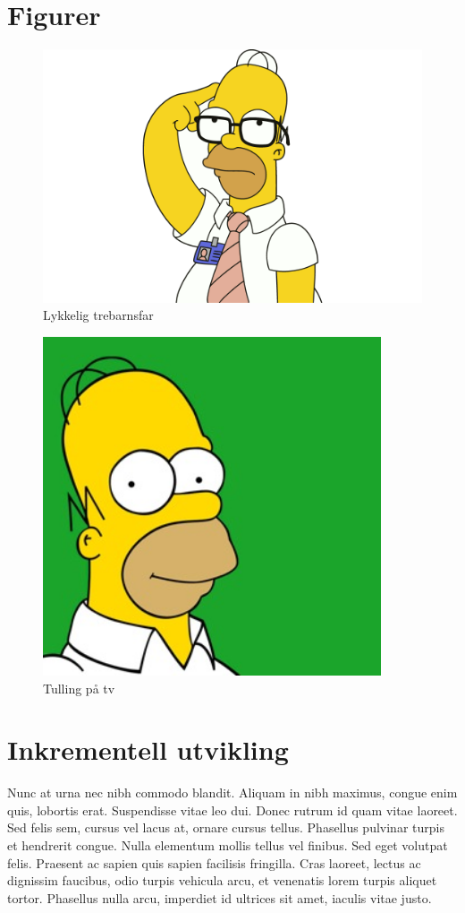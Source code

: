 \section{Figurer}
\begin{figure}[h]
	\centering
	\includegraphics[width=\textwidth]{gfx/homer-simpson}
	\caption[Homer Simpson]{Lykkelig trebarnsfar}
	\label{figur:HomerSimpson Trebarnsfar}
\end{figure}

\begin{figure}[h]
	\centering
	\includegraphics[width=10cm]{gfx/homer-simpson-300}
	\caption[Homer Simpson 2]{Tulling på tv}
	\label{figur:Slaven til Mr.Burns}
\end{figure}


\section{Inkrementell utvikling}
Nunc at urna nec nibh commodo blandit. Aliquam in nibh maximus, congue enim quis, lobortis erat. Suspendisse vitae leo dui. Donec rutrum id quam vitae laoreet. Sed felis sem, cursus vel lacus at, ornare cursus tellus. Phasellus pulvinar turpis et hendrerit congue. Nulla elementum mollis tellus vel finibus. Sed eget volutpat felis. Praesent ac sapien quis sapien facilisis fringilla. Cras laoreet, lectus ac dignissim faucibus, odio turpis vehicula arcu, et venenatis lorem turpis aliquet tortor. Phasellus nulla arcu, imperdiet id ultrices sit amet, iaculis vitae justo.


